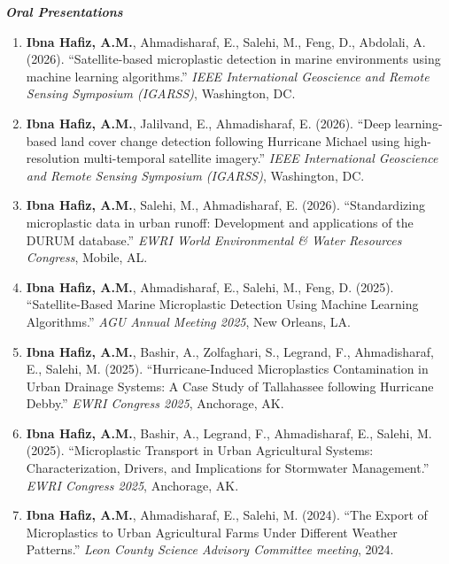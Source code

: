 \documentclass[a4paper,11pt]{article}
\begin{document}
\textbf{\textit{Oral Presentations}}
\vspace{1mm}
\small{
\begin{enumerate}[leftmargin=*, labelsep=0.5em, itemsep=1.5mm]

\item \textbf{Ibna Hafiz, A.M.}, Ahmadisharaf, E., Salehi, M., Feng, D., Abdolali, A. (2026). ``Satellite-based microplastic detection in marine environments using machine learning algorithms.'' \textit{IEEE International Geoscience and Remote Sensing Symposium (IGARSS)}, Washington, DC.

\item \textbf{Ibna Hafiz, A.M.}, Jalilvand, E., Ahmadisharaf, E. (2026). ``Deep learning-based land cover change detection following Hurricane Michael using high-resolution multi-temporal satellite imagery.'' \textit{IEEE International Geoscience and Remote Sensing Symposium (IGARSS)}, Washington, DC.

\item \textbf{Ibna Hafiz, A.M.}, Salehi, M., Ahmadisharaf, E. (2026). ``Standardizing microplastic data in urban runoff: Development and applications of the DURUM database.'' \textit{EWRI World Environmental \& Water Resources Congress}, Mobile, AL.

\item \textbf{Ibna Hafiz, A.M.}, Ahmadisharaf, E., Salehi, M., Feng, D. (2025). ``Satellite-Based Marine Microplastic Detection Using Machine Learning Algorithms.'' \textit{AGU Annual Meeting 2025}, New Orleans, LA.

\item \textbf{Ibna Hafiz, A.M.}, Bashir, A., Zolfaghari, S., Legrand, F., Ahmadisharaf, E., Salehi, M. (2025). ``Hurricane-Induced Microplastics Contamination in Urban Drainage Systems: A Case Study of Tallahassee following Hurricane Debby.'' \textit{EWRI Congress 2025}, Anchorage, AK.

\item \textbf{Ibna Hafiz, A.M.}, Bashir, A., Legrand, F., Ahmadisharaf, E., Salehi, M. (2025). ``Microplastic Transport in Urban Agricultural Systems: Characterization, Drivers, and Implications for Stormwater Management.'' \textit{EWRI Congress 2025}, Anchorage, AK.

\item \textbf{Ibna Hafiz, A.M.}, Ahmadisharaf, E., Salehi, M. (2024). ``The Export of Microplastics to Urban Agricultural Farms Under Different Weather Patterns.'' \textit{Leon County Science Advisory Committee meeting}, 2024.

\end{enumerate}
}
\vspace{1mm}
\end{document}
